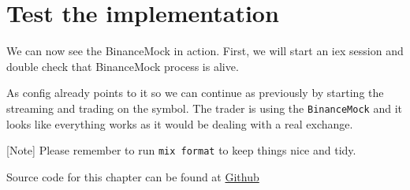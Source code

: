 \documentclass[
]{book}
\newenvironment{Shaded}{\begin{snugshade}}{\end{snugshade}}
\newcommand{\AttributeTok}[1]{\textcolor[rgb]{0.77,0.63,0.00}{#1}}
\newcommand{\CommentTok}[1]{\textcolor[rgb]{0.56,0.35,0.01}{\textit{#1}}}
\newcommand{\ErrorTok}[1]{\textcolor[rgb]{0.64,0.00,0.00}{\textbf{#1}}}
\newcommand{\ExtensionTok}[1]{#1}
\newcommand{\KeywordTok}[1]{\textcolor[rgb]{0.13,0.29,0.53}{\textbf{#1}}}
\newcommand{\NormalTok}[1]{#1}
\newcommand{\OperatorTok}[1]{\textcolor[rgb]{0.81,0.36,0.00}{\textbf{#1}}}
\newcommand{\StringTok}[1]{\textcolor[rgb]{0.31,0.60,0.02}{#1}}
\begin{document}
\hypertarget{test-the-implementation}{%
\section{Test the implementation}\label{test-the-implementation}}

We can now see the BinanceMock in action. First, we will start an iex session and double check that BinanceMock process is alive.

\begin{Shaded}
\end{Shaded}

As config already points to it so we can continue as previously by starting the streaming and trading on the symbol. The trader is using the \texttt{BinanceMock} and it looks like everything works as it would be dealing with a real exchange.

{[}Note{]} Please remember to run \texttt{mix\ format} to keep things nice and tidy.

Source code for this chapter can be found at \href{https://github.com/frathon/create-a-cryptocurrency-trading-bot-in-elixir-source-code/tree/chapter_04}{Github}
\end{document}
